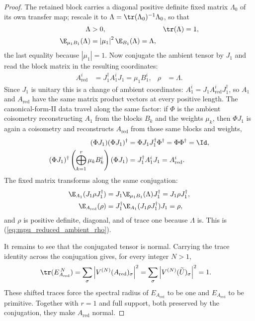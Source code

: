 \begin{proof}
    The retained block carries a diagonal positive definite fixed matrix
    $\Lambda_0$ of its own transfer map; rescale it to
    $\Lambda=\tr(\Lambda_0)^{-1}\Lambda_0$, so that
    \begin{align}
        \Lambda                & >0,
                               & \tr(\Lambda)                           & =1, \\
        \E_{\mu_1B_1}(\Lambda) & =\left|\mu_1\right|^2\E_{B_1}(\Lambda)
        =\Lambda,
    \end{align}
    the last equality because $\left|\mu_1\right|=1$. Now conjugate the
    ambient tensor by $J_1$ and read the block matrix in the resulting
    coordinates:
    \begin{align}
        A_{\mathrm{red}}^i & =J_1^\dagger A_1^iJ_1=\mu_1B_1^i,
                           & \rho                              & =\Lambda.
    \end{align}
    Since $J_1$ is unitary this is a change of ambient coordinates:
    $A_1^i=J_1A_{\mathrm{red}}^iJ_1^\dagger$, so $A_1$ and $A_{\mathrm{red}}$
    have the same matrix product vectors at every positive length. The
    canonical-form-II data travel along the same factor: if $\Phi$ is the
    ambient coisometry reconstructing $A_1$ from the blocks $B_k$ and the
    weights $\mu_k$, then $\Phi J_1$ is again a coisometry and reconstructs
    $A_{\mathrm{red}}$ from those same blocks and weights,
    \begin{align}
        (\Phi J_1)(\Phi J_1)^\dagger
         & =\Phi J_1J_1^\dagger\Phi^\dagger=\Phi\Phi^\dagger=\Id, \\
        (\Phi J_1)^\dagger\left(\bigoplus_{k=1}^{r}\mu_kB_k^i\right)(\Phi J_1)
         & =J_1^\dagger A_1^iJ_1=A_{\mathrm{red}}^i.
    \end{align}
    The fixed matrix transforms along the same conjugation:
    \begin{align}
        \E_{A_1}(J_1\rho J_1^\dagger)
         & =J_1\E_{\mu_1B_1}(\Lambda)J_1^\dagger=J_1\rho J_1^\dagger, \\
        \E_{A_{\mathrm{red}}}(\rho)
         & =J_1^\dagger\E_{A_1}(J_1\rho J_1^\dagger)J_1=\rho,
    \end{align}
    and $\rho$ is positive definite, diagonal, and of trace one because
    $\Lambda$ is. This is (\ref{eq:mpu_reduced_ambient_rho}).

    It remains to see that the conjugated tensor is normal. Carrying the
    trace identity across the conjugation gives, for every integer $N>1$,
    \begin{align}
        \tr(E_{A_{\mathrm{red}}}^{\,N})
         & =\sum_\sigma\left|V^{(N)}(A_{\mathrm{red}})_\sigma\right|^2
        =\sum_\sigma\left|V^{(N)}(\widetilde U)_\sigma\right|^2=1.
    \end{align}
    These shifted traces force the spectral radius of $E_{A_{\mathrm{red}}}$
    to be one and $E_{A_{\mathrm{red}}}$ to be primitive. Together with $r=1$
    and full support, both preserved by the conjugation, they make
    $A_{\mathrm{red}}$ normal.
\end{proof}

